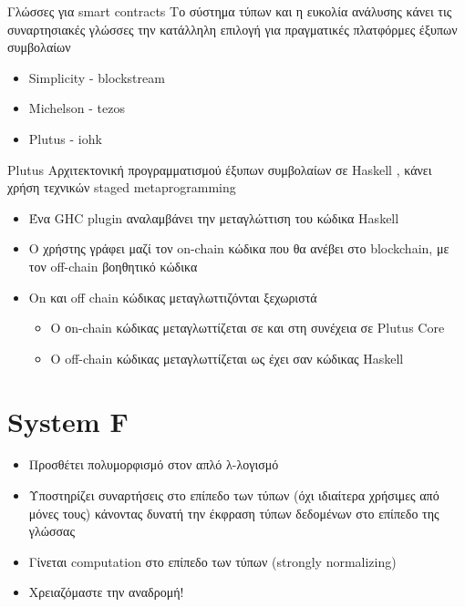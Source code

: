 \documentclass[10pt]{beamer}
\begin{document}
\begin{frame}{Γλώσσες για smart contracts}
Το σύστημα τύπων και η ευκολία ανάλυσης κάνει τις
συναρτησιακές γλώσσες την κατάλληλη επιλογή για πραγματικές πλατφόρμες έξυπων συμβολαίων
\begin{itemize}
    \item
    Simplicity - blockstream
    \item
    Michelson - tezos
    \item
    Plutus - iohk
    \end{itemize}


\end{frame}

\begin{frame}{Plutus}
Αρχιτεκτονική προγραμματισμού έξυπων συμβολαίων σε Haskell ,
κάνει χρήση τεχνικών staged metaprogramming

    \begin{itemize}
        \item Ένα GHC plugin αναλαμβάνει την μεταγλώττιση του κώδικα Haskell
        \item Ο χρήστης γράφει μαζί τον on-chain κώδικα που
        θα ανέβει στο blockchain, με τον off-chain βοηθητικό κώδικα
        \item On και off chain κώδικας μεταγλωττιζόνται ξεχωριστά
        \begin{itemize}
            \item  O οn-chain κώδικας μεταγλωττίζεται σε \FIR{} και στη συνέχεια
            σε Plutus Core
            \item  Ο off-chain κώδικας μεταγλωττίζεται ως έχει σαν κώδικας
            Haskell
        \end{itemize}

     \end{itemize}
\end{frame}

\section{ System F}

\begin{frame}{\FOM}

\begin{itemize}
    \item Προσθέτει πολυμορφισμό στον  απλό λ-λογισμό
    \item Υποστηρίζει συναρτήσεις στο επίπεδο των τύπων (όχι ιδιαίτερα χρήσιμες από μόνες τους) κάνοντας δυνατή την έκφραση τύπων δεδομένων στο επίπεδο της γλώσσας
    \item Γίνεται computation στο επίπεδο των τύπων (strongly normalizing)
    \item \alert{Χρειαζόμαστε την αναδρομή!}
    \end{itemize}

\end{frame}
\end{document}
